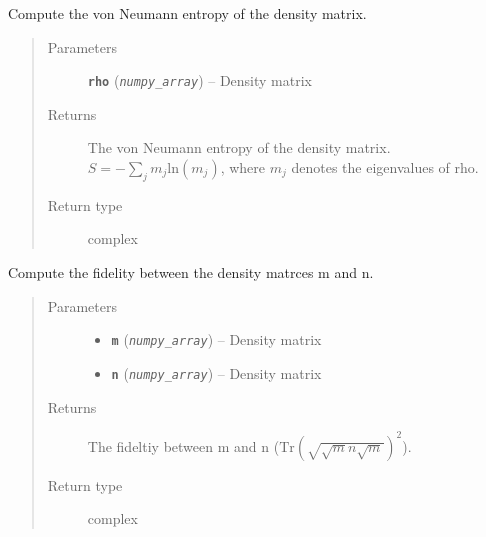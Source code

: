 \documentclass[letterpaper,10pt,english]{sphinxmanual}
\begin{document}
\begin{fulllineitems}
\begin{fulllineitems}
\end{fulllineitems}


\begin{fulllineitems}
\label{modules:Tomography.DensityMatrix.entropy_neumann}
Compute the von Neumann entropy of the density matrix.
\begin{quote}\begin{description}
\item[{Parameters}] \leavevmode
\textbf{\texttt{rho}} (\emph{\texttt{numpy\_array}}) -- Density matrix

\item[{Returns}] \leavevmode
The von Neumann entropy of the density matrix. \(S=-\sum_{j}^{}m_j \mathrm{ln}(m_j)\), where \(m_j\) denotes the eigenvalues of rho.

\item[{Return type}] \leavevmode
complex

\end{description}\end{quote}

\end{fulllineitems}


\begin{fulllineitems}
\label{modules:Tomography.DensityMatrix.fidelity}
Compute the fidelity between the density matrces m and n.
\begin{quote}\begin{description}
\item[{Parameters}] \leavevmode\begin{itemize}
\item {} 
\textbf{\texttt{m}} (\emph{\texttt{numpy\_array}}) -- Density matrix

\item {} 
\textbf{\texttt{n}} (\emph{\texttt{numpy\_array}}) -- Density matrix

\end{itemize}

\item[{Returns}] \leavevmode
The fideltiy between m and n (\(\mathrm{Tr}(\sqrt{\sqrt{m}n\sqrt{m}})^2\)).

\item[{Return type}] \leavevmode
complex


\end{description}
\end{quote}
\end{fulllineitems}
\end{fulllineitems}
\end{document}
